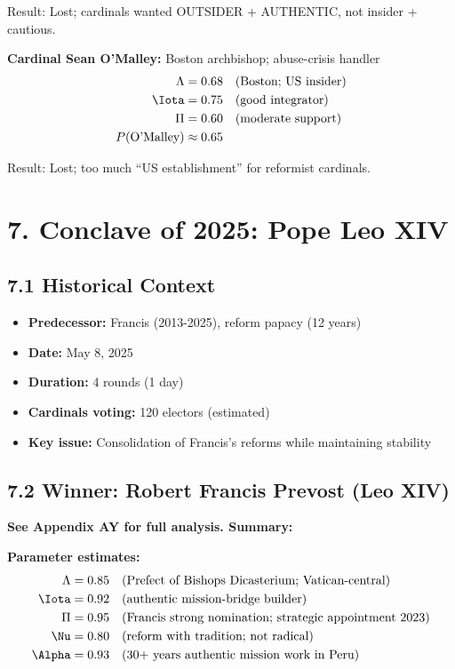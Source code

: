 \documentclass[11pt]{article}
\begin{document}
Result: Lost; cardinals wanted OUTSIDER + AUTHENTIC, not insider + cautious.

\textbf{Cardinal Sean O'Malley:} Boston archbishop; abuse-crisis handler
\begin{align*}
\Lambda &= 0.68 \quad \text{(Boston; US insider)} \\
\Iota &= 0.75 \quad \text{(good integrator)} \\
\Pi &= 0.60 \quad \text{(moderate support)} \\
P(\text{O'Malley}) &\approx 0.65
\end{align*}

Result: Lost; too much ``US establishment'' for reformist cardinals.

\section{7. Conclave of 2025: Pope Leo XIV}

\subsection{7.1 Historical Context}

\begin{itemize}
\item \textbf{Predecessor:} Francis (2013-2025), reform papacy (12 years)
\item \textbf{Date:} May 8, 2025
\item \textbf{Duration:} 4 rounds (1 day)
\item \textbf{Cardinals voting:} 120 electors (estimated)
\item \textbf{Key issue:} Consolidation of Francis's reforms while maintaining stability
\end{itemize}

\subsection{7.2 Winner: Robert Francis Prevost (Leo XIV)}

\textbf{See Appendix AY for full analysis. Summary:}

\textbf{Parameter estimates:}
\begin{align*}
\Lambda &= 0.85 \quad \text{(Prefect of Bishops Dicasterium; Vatican-central)} \\
\Iota &= 0.92 \quad \text{(authentic mission-bridge builder)} \\
\Pi &= 0.95 \quad \text{(Francis strong nomination; strategic appointment 2023)} \\
\Nu &= 0.80 \quad \text{(reform with tradition; not radical)} \\
\Alpha &= 0.93 \quad \text{(30+ years authentic mission work in Peru)}
\end{align*}
\end{document}
